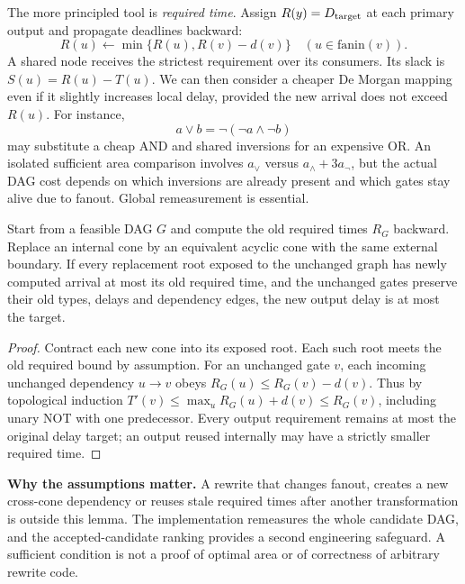The more principled tool is \emph{required time}. Assign $R(y)=D_{\rm target}$ at each primary output and propagate deadlines backward:
\begin{equation}\label{eq:logrequired}
 R(u)\gets\min\{R(u),R(v)-d(v)\}
 \quad(u\in\mathrm{fanin}(v)).
\end{equation}
A shared node receives the strictest requirement over its consumers. Its slack is $S(u)=R(u)-T(u)$. We can then consider a cheaper De Morgan mapping even if it slightly increases local delay, provided the new arrival does not exceed $R(u)$. For instance,
\begin{equation}
 a\lor b=\neg(\neg a\land\neg b)
\end{equation}
may substitute a cheap AND and shared inversions for an expensive OR. An isolated sufficient area comparison involves $a_{\lor}$ versus $a_{\land}+3a_{\neg}$, but the actual DAG cost depends on which inversions are already present and which gates stay alive due to fanout. Global remeasurement is essential.

\begin{lemma}
Start from a feasible DAG $G$ and compute the old required times $R_G$ backward. Replace an internal cone by an equivalent acyclic cone with the same external boundary. If every replacement root exposed to the unchanged graph has newly computed arrival at most its old required time, and the unchanged gates preserve their old types, delays and dependency edges, the new output delay is at most the target.
\end{lemma}
\begin{proof}
Contract each new cone into its exposed root. Each such root meets the old required bound by assumption. For an unchanged gate $v$, each incoming unchanged dependency $u\to v$ obeys $R_G(u)\le R_G(v)-d(v)$. Thus by topological induction $T'(v)\le\max_u R_G(u)+d(v)\le R_G(v)$, including unary NOT with one predecessor. Every output requirement remains at most the original delay target; an output reused internally may have a strictly smaller required time.
\end{proof}
\textbf{Why the assumptions matter.} A rewrite that changes fanout, creates a new cross-cone dependency or reuses stale required times after another transformation is outside this lemma. The implementation remeasures the whole candidate DAG, and the accepted-candidate ranking provides a second engineering safeguard. A sufficient condition is not a proof of optimal area or of correctness of arbitrary rewrite code.

